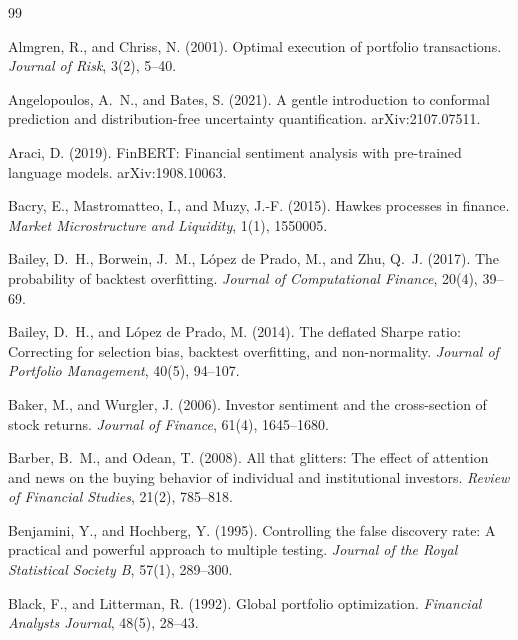 \documentclass[11pt,a4paper]{article}
\theoremstyle{plain}
\theoremstyle{definition}
\theoremstyle{remark}
\begin{document}
\clearpage
\begin{thebibliography}{99}\small

Almgren, R., and Chriss, N. (2001). Optimal execution of portfolio transactions. \emph{Journal of Risk}, 3(2), 5--40.

Angelopoulos, A.~N., and Bates, S. (2021). A gentle introduction to conformal prediction and distribution-free uncertainty quantification. arXiv:2107.07511.

Araci, D. (2019). FinBERT: Financial sentiment analysis with pre-trained language models. arXiv:1908.10063.

Bacry, E., Mastromatteo, I., and Muzy, J.-F. (2015). Hawkes processes in finance. \emph{Market Microstructure and Liquidity}, 1(1), 1550005.

Bailey, D.~H., Borwein, J.~M., L\'opez de Prado, M., and Zhu, Q.~J. (2017). The probability of backtest overfitting. \emph{Journal of Computational Finance}, 20(4), 39--69.

Bailey, D.~H., and L\'opez de Prado, M. (2014). The deflated Sharpe ratio: Correcting for selection bias, backtest overfitting, and non-normality. \emph{Journal of Portfolio Management}, 40(5), 94--107.

Baker, M., and Wurgler, J. (2006). Investor sentiment and the cross-section of stock returns. \emph{Journal of Finance}, 61(4), 1645--1680.

Barber, B.~M., and Odean, T. (2008). All that glitters: The effect of attention and news on the buying behavior of individual and institutional investors. \emph{Review of Financial Studies}, 21(2), 785--818.

Benjamini, Y., and Hochberg, Y. (1995). Controlling the false discovery rate: A practical and powerful approach to multiple testing. \emph{Journal of the Royal Statistical Society B}, 57(1), 289--300.

Black, F., and Litterman, R. (1992). Global portfolio optimization. \emph{Financial Analysts Journal}, 48(5), 28--43.


\end{thebibliography}
\end{document}
